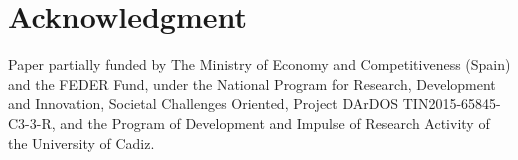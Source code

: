 \documentclass[journal]{IEEEtran}
\begin{document}
\section*{Acknowledgment}

Paper partially funded by The Ministry of Economy and Competitiveness (Spain) and the FEDER Fund, under the National Program for 
Research, Development and Innovation, Societal Challenges Oriented, Project DArDOS TIN2015-65845-C3-3-R, and the Program of
Development and Impulse of Research Activity of the University of Cadiz.


%
%



%
%
\end{document}
